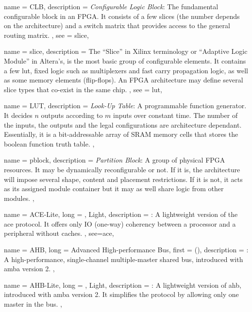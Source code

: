 {
	name = {CLB},
	description = {\emph{Configurable Logic Block}:
		The fundamental configurable block in an FPGA. It consists of a few \Glspl{slice}
		(the number depends on the architecture) and a switch matrix that provides
		access to the general routing matrix.
	},
	see = {slice},
}

{
	name = {slice},
	description = {
		The ``Slice'' in Xilinx terminology or ``Adaptive Logic Module'' in Altera's,
		is the most basic group of configurable elements. It contains a few \gls{lut},
		fixed logic such as multiplexers and fast carry propagation logic, as well as
		some memory elements (flip-flops). An FPGA architecture may define several slice types
		that co-exist in the same chip.
	},
	see = {lut},
}

{
	name = {LUT},
	description = {\emph{Look-Up Table}: 
		A programmable function generator. It decides $n$ outputs according to $m$ inputs
		over constant time. 
		The number of the inputs, the outputs and the legal configurations
		are architecture dependant. 
		Essentially, it is a bit-addressable array of SRAM memory cells
		that stores the boolean function truth table.
	},
}

{
	name = {pblock},
	description = {\emph{Partition Block}:
		A group of physical FPGA resources. It may be dynamically reconfigurable or not.
		If it is, the architecture will impose several shape, content and placement restrictions.
		If it is not, it acts as its assigned module container but it may as well share logic
		from other modules.
	},
}

{
	name = {ACE-Lite},
	long = {, Light},
	description = {\emph{}:
		A lightweight version of the \gls{ace} protocol. It offers only IO (one-way) coherency
		between a processor and a peripheral without caches.
	},
	see={ace},
}


{
	name = {AHB},
	long = {Advanced High-performance Bus},
	first = { ()},
	description = {\emph{}:
		A high-performance, single-channel multiple-master shared bus, 
		introduced with \gls{amba} version 2.
	},
}


{
	name = {AHB-Lite},
	long = {, Light},
	description = {\emph{}:
		A lightweight version of \gls{ahb}, introduced with \gls{amba} version 2.
		It simplifies the protocol by allowing only one master in the bus.
	},
}


